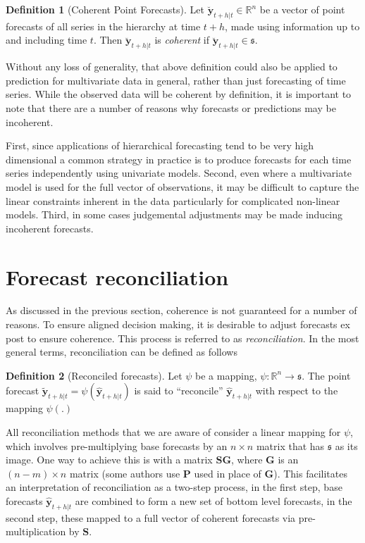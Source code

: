 \documentclass[12pt]{article}
\theoremstyle{definition}
\newtheorem{definition}{Definition}[section]
\theoremstyle{property}
\begin{document}
	\begin{definition}[Coherent Point Forecasts]\label{def:cohpoint}
		Let $\breve{\bm{y}}_{t+h|t} \in \mathbb{R}^n$ be a vector of point forecasts of all series in the hierarchy at time $t+h$, made using information up to and including time $t$. Then $\breve{\bm{y}}_{t+h|t}$ is \emph{coherent} if $\breve{\bm{y}}_{t+h|t} \in \mathfrak{s}$.
	\end{definition}

    Without any loss of generality, that above definition could also be applied to prediction for multivariate data in general, rather than just forecasting of time series.  While the observed data will be coherent by definition, it is important to note that there are a number of reasons why forecasts or predictions may be incoherent.      
    
    First, since applications of hierarchical forecasting tend to be very high dimensional a common strategy in practice is to produce forecasts for each time series independently using univariate models.  Second, even where a multivariate model is used for the full vector of observations, it may be difficult to capture the linear constraints inherent in the data particularly for complicated non-linear models.  Third, in some cases judgemental adjustments may be made inducing incoherent forecasts. 
	
	
	
\section{Forecast reconciliation}\label{sec:Reconciliation}
	
	As discussed in the previous section, coherence is not guaranteed for a number of reasons.  To ensure aligned decision making, it is desirable to adjust forecasts ex post to ensure coherence.  This process is referred to as {\em reconciliation}.  In the most general terms, reconciliation can be defined as follows
	
	\begin{definition}[Reconciled forecasts]\label{def:reconpoint}
		Let $\psi$ be a mapping, $\psi:\mathbb{R}^n\rightarrow\mathfrak{s}$.  The point forecast $\tilde{\bm{y}}_{t+h|t}=\psi\left(\hat{\bm{y}}_{t+h|t}\right)$ is said to ``reconcile'' $\hat{\bm{y}}_{t+h|t}$ with respect to the mapping $\psi(.)$
	\end{definition}
	
	All reconciliation methods that we are aware of consider a linear mapping for $\psi$, which involves pre-multiplying base forecasts by an $n\times n$ matrix that has $\mathfrak{s}$ as its image.  One way to achieve this is with a matrix $\bm{SG}$, where $\bm{G}$ is an $(n-m)\times n$ matrix  (some authors use $\bm{P}$ used in place of $\bm{G}$).  This facilitates an interpretation of reconciliation as a two-step process, in the first step, base forecasts $\hat{\bm{y}}_{t+h|t}$ are combined to form a new set of bottom level forecasts, in the second step, these mapped to a full vector of coherent forecasts via pre-multiplication by $\bm{S}$.  
	
\end{document}
